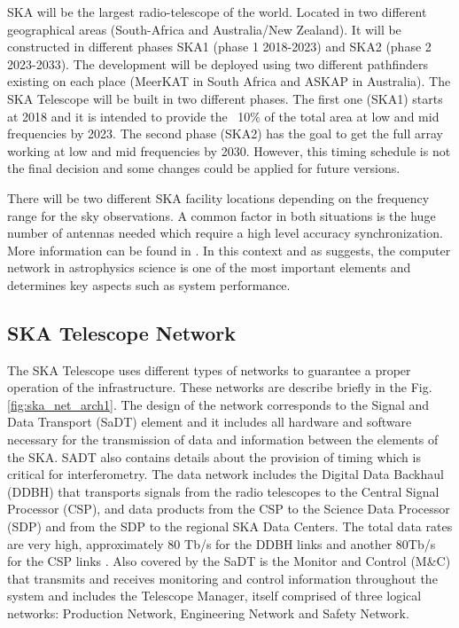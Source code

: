 SKA will be the largest radio-telescope of the 
world. Located in two different geographical areas (South-Africa and 
Australia/New Zealand). It will be 
constructed in different phases SKA1 (phase 1 2018-2023) and SKA2 (phase 2 
2023-2033). The development will be deployed using two different pathfinders 
existing on each place (MeerKAT in South Africa and ASKAP in Australia). 
The SKA Telescope will be built in two different phases. The first one (SKA1)
starts at 2018 and it is intended to provide the ~10\% of the total area at low and 
mid frequencies by 2023. The second phase (SKA2) has the goal to get the full
array working at low and mid frequencies by 2030. However, this timing schedule is
not the final decision and some changes could be applied for future versions.

There will be two different SKA facility locations depending on the frequency 
range for the sky observations. A common factor in both situations is the 
huge number of antennas needed which require a high level accuracy 
synchronization. More information can be found in  
\cite{ska:baseline_description_v2}. In this context and as \cite{HUANG201727} suggests, the computer network in astrophysics science is one of the most important elements and determines key aspects such as system performance.

\subsection{SKA Telescope Network} \label{subsec:ska-telescope}

The SKA Telescope uses different types of networks to guarantee a proper operation of the infrastructure. These networks are describe briefly in the Fig. \ref{fig:ska_net_arch1}. The design of the network corresponds to the Signal and Data Transport (SaDT) element \cite{ska:sadt_website} and it includes all hardware and software necessary for the transmission of data and information between the elements of the SKA. SADT also contains details about the provision of timing which is critical for interferometry.
The data network includes the Digital Data Backhaul (DDBH) that transports signals from the radio telescopes to the Central Signal Processor (CSP), and data products from the CSP to the Science Data Processor (SDP) and from the SDP to the regional SKA Data Centers. The total data rates are very high, approximately 80 Tb/s for the DDBH links and another 80Tb/s for the CSP links \cite{ska:consortia-news}. 
Also covered by the SaDT is the Monitor and Control (M\&C) that transmits and receives monitoring and control information throughout the system and includes the Telescope Manager, itself comprised of three logical networks: Production Network, Engineering Network and Safety Network.

